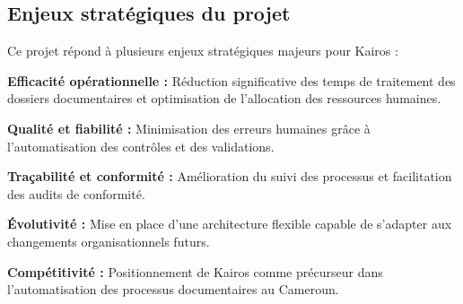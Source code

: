     \subsection{Enjeux stratégiques du projet}
    
    Ce projet répond à plusieurs enjeux stratégiques majeurs pour Kairos :
    
    \textbf{Efficacité opérationnelle :} Réduction significative des temps de traitement des dossiers documentaires et optimisation de l'allocation des ressources humaines.
    
    \textbf{Qualité et fiabilité :} Minimisation des erreurs humaines grâce à l'automatisation des contrôles et des validations.
    
    \textbf{Traçabilité et conformité :} Amélioration du suivi des processus et facilitation des audits de conformité.
    
    \textbf{Évolutivité :} Mise en place d'une architecture flexible capable de s'adapter aux changements organisationnels futurs.
    
    \textbf{Compétitivité :} Positionnement de Kairos comme précurseur dans l'automatisation des processus documentaires au Cameroun.




